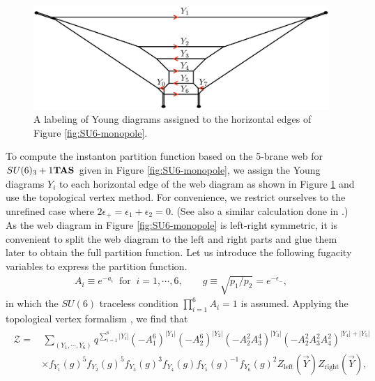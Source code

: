 \documentclass[letterpaper, 11pt]{article}
\begin{document}
{%
\begin{figure}[t]
\centering
\includegraphics[width=12cm]{SU6young.pdf}
\caption{A labeling of Young diagrams assigned to the horizontal edges of Figure \ref{fig:SU6-monopole}.}
\label{fig:SU6young}
\end{figure}
To compute the instanton partition function based on the 5-brane web for $SU(6)_3+1{\bf TAS}$ given in Figure \ref{fig:SU6-monopole}, we assign the Young diagrams $Y_i$ to each horizontal edge of the web diagram as shown in Figure \ref{fig:SU6young} and use the topological vertex method. For convenience, we restrict ourselves to the unrefined case where $2\epsilon_+=\epsilon_1+\epsilon_2=0$. (See also a similar calculation done in \cite{Hayashi:2019yxj}.) As the web diagram in Figure \ref{fig:SU6-monopole} is left-right symmetric, it is convenient to split the web diagram to the left and right parts and glue them later to obtain the full partition function. Let us introduce the following fugacity variables to express the partition function.
\begin{align}
A_i \equiv e^{-a_i} \ \text{ for } \ i=1, \cdots, 6
, \qquad g\equiv \sqrt{p_1/p_2} = e^{-\epsilon_-},
\end{align}
in which the $SU(6)$ traceless condition $\prod_{i=1}^{6}A_i =1$ is assumed. Applying the topological vertex formalism \cite{Aganagic:2003db}, we find that 
\begin{align}
  \label{eq:znek-su6}
  \begin{split}
  \mathcal{Z} 
  =&\, \sum_{(Y_1, \cdots, Y_6)}q^{\sum_{i=1}^6|Y_i|} (-A_1^6)^{|Y_1|}(-A_2^6)^{|Y_2|}(-A_2^2A_3^4)^{|Y_3|}(-A_2^2A_3^2A_4^2)^{|Y_4| + |Y_5|}\\
  &\times f_{Y_1}(g)^5f_{Y_2}(g)^5f_{Y_3}(g)^3f_{Y_4}(g)f_{Y_5}(g)^{-1}f_{Y_6}(g)^{2}
  Z_{\text{left}}(\vec{Y})Z_{\text{right}}(\vec{Y}),
 \end{split}

\end{align}}
\end{document}
